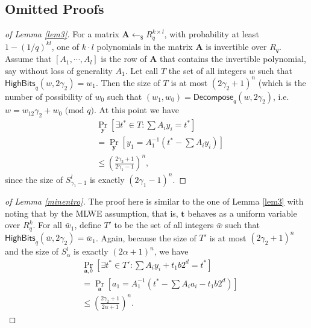 \documentclass[conference]{IEEEtran}
\newtheorem{proof}{Proof}
\begin{document}
		
		
		\subsection{Omitted Proofs} \label{omit}
		
			\begin{proof}[of Lemma \ref{lem3}]
			
			For a matrix $\mathbf{A} \leftarrow_{\$} R_q^{k \times l}$, with probability at least $1-(1/q)^{kl}$, one of $k\cdot l$ polynomials in the matrix $\mathbf{A}$ is invertible over $R_q$. 
			Assume that $[A_1,\cdots, A_l]$ is the row of $\mathbf{A}$ that contains the invertible polynomial, say without loss of generality $A_1$. Let call $T$ the set of all integers $w$ such that  $\mathsf{HighBits}_q(w, 2\gamma_2)=w_1$. Then the size of $T$ is at most $(2\gamma_2+1)^n$ (which is the number of possibility of $w_0$ such that $(w_1,w_0)=\textsf{Decompose}_q(w,2\gamma_2)$, i.e. $w=w_12\gamma_2+w_0 \text{ (mod } q)$.
			At this point we have 
			\begin{equation*}
			\begin{split}
			&\Pr_{\mathbf{y}}\left[\exists t^*\in T: \sum A_iy_i =t^*\right] \\&=	\Pr_{\mathbf{y}}[y_1 = A_1^{-1}(t^*-\sum A_iy_i )] \\&\leq \left(\frac{2\gamma_2+1}{2\gamma_1-1}\right)^n,
			\end{split}
			\end{equation*}
			since the size of $S_{\gamma_1-1}^l$ is exactly $(2\gamma_1-1)^n$.
		\end{proof}
	
	
	
		\begin{proof}[of Lemma \ref{minentro}] 
		The proof here is similar to the one of Lemma \ref{lem3} with noting that by the \textsf{MLWE} assumption, that is, $\mathbf{t}$ behaves as a uniform variable over $R_q^{k}$.
		For all $\bar{w}_1$, define $T'$ to be the set of all integers $\bar{w}$ such that  $\mathsf{HighBits}_q(\bar{w}, 2\gamma_2)=\bar{w}_1$. Again, because the size of $T'$ is at most $(2\gamma_2+1)^n$ and the size of $S_{\alpha}^l$ is exactly $(2\alpha+1)^n$, we have 
		\begin{equation*}
		\begin{split}
		&\Pr_{\mathbf{a},b}\left[\exists t^*\in T': \sum A_iy_i+t_1b2^d =t^*\right] \\&=	\Pr_{\mathbf{a}}[a_1 = A_1^{-1}(t^*-\sum A_ia_i -t_1b2^d)]\\
		& \leq \left(\frac{2\gamma_2+1}{2\alpha+1}\right)^n.
		\end{split}
		\end{equation*}
	\end{proof}
	
\end{document}
